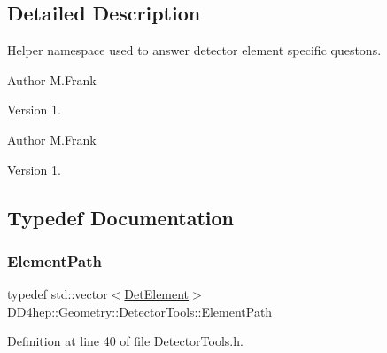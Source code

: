\subsection{Detailed Description}
Helper namespace used to answer detector element specific questons. 

\begin{DoxyAuthor}{Author}
M.\+Frank 
\end{DoxyAuthor}
\begin{DoxyVersion}{Version}
1.
\end{DoxyVersion}
\begin{DoxyAuthor}{Author}
M.\+Frank 
\end{DoxyAuthor}
\begin{DoxyVersion}{Version}
1. 
\end{DoxyVersion}


\subsection{Typedef Documentation}
\hypertarget{namespace_d_d4hep_1_1_geometry_1_1_detector_tools_a57c8f37a975258fd84676a69e74c56ab}{}\label{namespace_d_d4hep_1_1_geometry_1_1_detector_tools_a57c8f37a975258fd84676a69e74c56ab} 
\subsubsection{\texorpdfstring{Element\+Path}{ElementPath}}
{\footnotesize\ttfamily typedef std\+::vector$<$\hyperlink{class_d_d4hep_1_1_geometry_1_1_det_element}{Det\+Element}$>$ \hyperlink{namespace_d_d4hep_1_1_geometry_1_1_detector_tools_a57c8f37a975258fd84676a69e74c56ab}{D\+D4hep\+::\+Geometry\+::\+Detector\+Tools\+::\+Element\+Path}}



Definition at line 40 of file Detector\+Tools.\+h.

\hypertarget{namespace_d_d4hep_1_1_geometry_1_1_detector_tools_a6cc33285199e04dd336a33e6e62925e6}{}\label{namespace_d_d4hep_1_1_geometry_1_1_detector_tools_a6cc33285199e04dd336a33e6e62925e6} 
